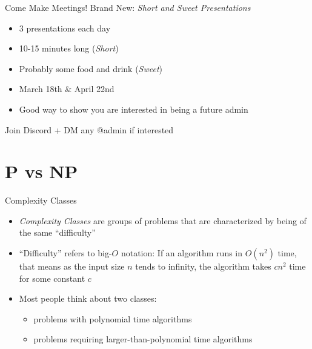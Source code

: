 \documentclass[aspectratio=169]{beamer}
\begin{document}
\begin{frame}{Come Make Meetings!}
    Brand New: \emph{Short and Sweet Presentations} \pause
    \begin{itemize}
        \item 3 presentations each day
        \item 10-15 minutes long (\emph{Short})
        \item Probably some food and drink (\emph{Sweet})
        \item March 18th \& April 22nd
        \item Good way to show you are interested in being a future admin
    \end{itemize} \pause
    Join Discord + DM any @admin if interested
\end{frame}

\section{P vs NP}
\frame{\sectionpage}


\begin{frame}{Complexity Classes}
    \begin{itemize}
        \item \emph{Complexity Classes} are groups of problems that are characterized by being of the same ``difficulty'' \pause
        \item ``Difficulty'' refers to big-$O$ notation: If an algorithm runs in $O(n^2)$ time, that means as the input size $n$ tends to infinity, the algorithm takes $cn^2$ time for some constant $c$ \pause
        \item Most people think about two classes: 
        \begin{itemize}
            \item problems with polynomial time algorithms
            \item problems requiring larger-than-polynomial time algorithms
        \end{itemize}
    \end{itemize}
\end{frame}
\end{document}

